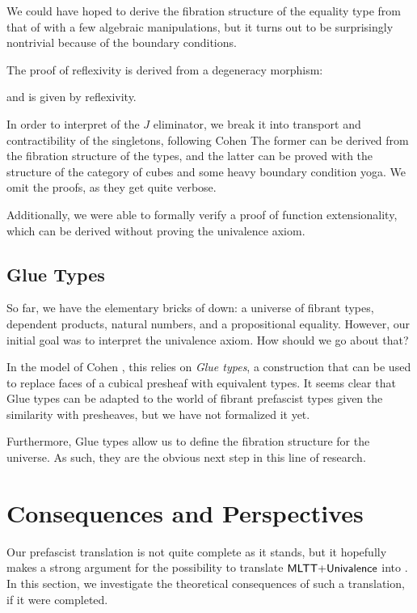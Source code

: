 We could have hoped to derive the fibration structure of the equality type 
from that of  with a few algebraic manipulations, but it turns
out to be surprisingly nontrivial because of the boundary conditions.

The proof of reflexivity is derived from a degeneracy morphism: 


and  is given by reflexivity.

In order to interpret of the \( J \) eliminator, we break it into 
transport and contractibility of the singletons, following Cohen \etal
% 
The former can be derived from the fibration structure of the types, and the
latter can be proved with the structure of the category of cubes and some
heavy boundary condition yoga.
% 
We omit the proofs, as they get quite verbose.

Additionally, we were able to formally verify a proof of function 
extensionality, which can be derived without proving the univalence axiom.

\subsection{Glue Types}

So far, we have the elementary bricks of \MLTT down: a universe of fibrant types,
dependent products, natural numbers, and a propositional equality.
% 
However, our initial goal was to interpret the univalence axiom. How should we go 
about that?

In the model of Cohen \etal, this relies on \emph{Glue types}, a construction 
that can be used to replace faces of a cubical presheaf with equivalent types.
% 
It seems clear that Glue types can be adapted to the world of fibrant prefascist 
types given the similarity with presheaves, but we have not formalized it yet.

Furthermore, Glue types allow us to define the fibration structure for the 
universe. As such, they are the obvious next step in this line of research.

\section{Consequences and Perspectives}
\label{sec:cubical-perspectives}

Our prefascist translation is not quite complete as it stands, but it hopefully 
makes a strong argument for the possibility to translate 
\( \mathsf{MLTT}{+}\mathsf{Univalence} \) into \SetoidCCplus.
% 
In this section, we investigate the theoretical consequences of such a 
translation, if it were completed.


